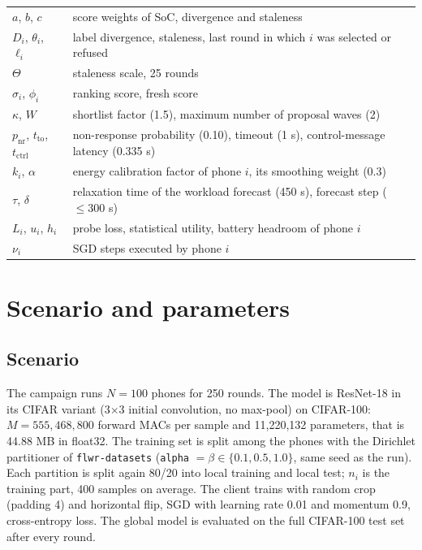 \documentclass[11pt,a4paper]{article}
\newcommand{\cf}[1]{\texttt{#1}}
\begin{document}
\begin{longtable}{p{}p{}}
$a$, $b$, $c$ & score weights of SoC, divergence and staleness \\
$D_i$, $\theta_i$, $\ell_i$ & label divergence, staleness, last round in which $i$ was selected or refused \\
$\Theta$ & staleness scale, 25 rounds \\
$\sigma_i$, $\phi_i$ & ranking score, fresh score \\
$\kappa$, $W$ & shortlist factor (1.5), maximum number of proposal waves (2) \\
$p_{\mathrm{nr}}$, $t_{\mathrm{to}}$, $t_{\mathrm{ctrl}}$ & non-response probability (0.10), timeout (1 s), control-message latency (0.335 s) \\
$k_i$, $\alpha$ & energy calibration factor of phone $i$, its smoothing weight (0.3) \\
$\tau$, $\delta$ & relaxation time of the workload forecast (450 s), forecast step ($\le 300$ s) \\
$L_i$, $u_i$, $h_i$ & probe loss, statistical utility, battery headroom of phone $i$ \\
$\nu_i$ & SGD steps executed by phone $i$ \\
\bottomrule
\end{longtable}

\newpage
\section{Scenario and parameters}
\label{sec:params}

\subsection{Scenario}

The campaign runs $N = 100$ phones for 250 rounds. The model is ResNet-18 in its
CIFAR variant (3$\times$3 initial convolution, no max-pool) on CIFAR-100: $M =
555{,}468{,}800$ forward MACs per sample and 11{,}220{,}132 parameters, that is
44.88 MB in float32. The training set is split among the phones with the
Dirichlet partitioner of \cf{flwr-datasets} (\cf{alpha} $= \beta \in \{0.1,
0.5, 1.0\}$, same seed as the run). Each partition is split again 80/20 into
local training and local test; $n_i$ is the training part, 400 samples on
average. The client trains with random crop (padding 4) and horizontal flip,
SGD with learning rate 0.01 and momentum 0.9, cross-entropy loss. The global
model is evaluated on the full CIFAR-100 test set after every round.
\end{document}
